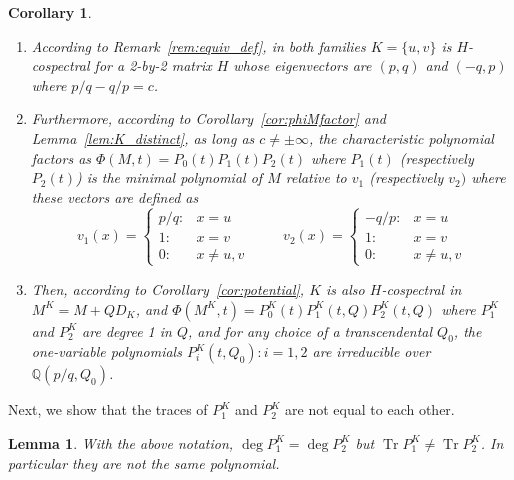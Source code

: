 \documentclass[11pt]{article}
\newtheorem{lemma}[theo]{Lemma}
\newtheorem{coro}[theo]{Corollary}
\theoremstyle{definition}
\numberwithin{equation}{section}
\newcommand\+{\mkern2mu}
\newcommand{\Q}{\mathbb{Q}}
\newcommand{\1}{\mathbf 1}
\DeclareMathOperator{\Tr}{Tr}
\begin{document}
\begin{coro}\label{cor:uv_example}~
\begin{enumerate}
\item According to Remark~\ref{rem:equiv_def}, in both families $K = \{u,v\}$ is $H$-cospectral for a 2-by-2 matrix $H$ whose eigenvectors are $(p,q)$ and $(-q,p)$ where $p/q - q/p = c$. 
\item Furthermore, according to Corollary~\ref{cor:phiMfactor} and Lemma~\ref{lem:K_distinct}, as long as $c \neq \pm \infty$, the characteristic polynomial factors as $\Phi(M,t) = P_0(t) P_1(t) P_2(t)$ where $P_1(t)$ (respectively $P_2(t)$) is the minimal polynomial of $M$ relative to $v_1$ (respectively $v_2)$  where these vectors are defined as 
\[ v_1(x) = \left \{ \begin{array}{cc} p/q :& x=u \\ 1 :& x=v \\ 0 :& x\neq u,v \end{array} \right.  \hspace{1cm} v_2(x) = \left \{ \begin{array}{cc} -q/p :& x=u \\ 1 :& x=v \\ 0 :& x\neq u,v \end{array} \right. \]
\item Then, according to Corollary~\ref{cor:potential}, $K$ is also $H$-cospectral in $M^K = M + Q D_K$, and $\Phi(M^K,t) = P^K_0(t) P^K_1(t,Q) P^K_2(t,Q)$ where $P^K_1$ and $P^K_2$ are degree 1 in $Q$, and for any choice of a transcendental $Q_0$, the one-variable polynomials $P^K_i(t,Q_0) : i = 1,2$ are irreducible over $\Q(p/q, Q_0)$.
\end{enumerate}
\end{coro}

Next, we show that the traces of $P^K_1$ and $P^K_2$ are not equal to each other.

\begin{lemma}\label{lem:STfamily_trace}
With the above notation, $\deg P^K_1 = \deg P^K_2$ but $\Tr P^K_1 \neq \Tr P^K_2$. In particular they are not the same polynomial.
\end{lemma}
\end{document}
